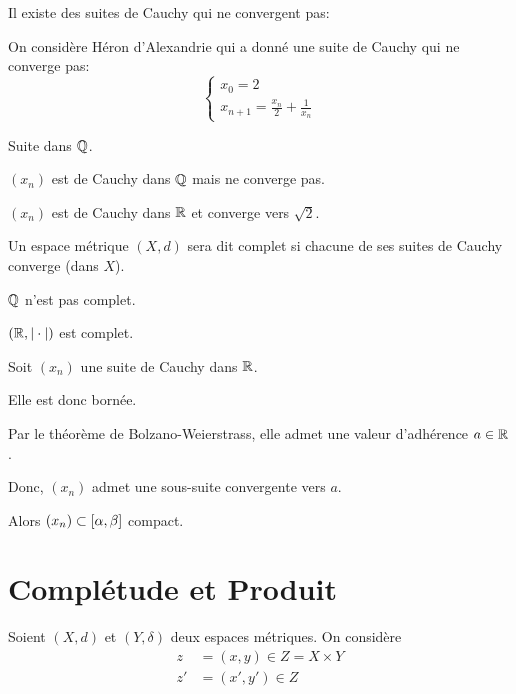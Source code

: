 \documentclass[french,a4paper,10pt]{article}
\begin{document}
    \begin{remark}
        Il existe des suites de Cauchy qui ne convergent pas:

        On considère Héron d'Alexandrie qui a donné une suite de Cauchy qui ne converge pas:
        \[\begin{cases}
            x_0=2\\
            x_{n+1}=\frac{x_n}2+\frac1{x_n}
        \end{cases}\]

        Suite dans $\mathbb{Q}$. 

        $(x_n)$ est de Cauchy dans $\mathbb{Q}$ mais ne converge pas.

        $(x_n)$ est de Cauchy dans $\mathbb{R}$ et converge vers $\sqrt 2$.
    \end{remark}

    \begin{definition}
        Un espace métrique $(X,d)$ sera dit complet si chacune de ses suites de Cauchy converge (dans $X$).
    \end{definition}

    \begin{example}
        $\mathbb{Q}$ n'est pas complet.
    \end{example}

    \begin{proposition}
        $(\mathbb{R},|\cdot|)$ est complet.
    \end{proposition}

    \begin{myproof}
        Soit $(x_n)$ une suite de Cauchy dans $\mathbb{R}$.

        Elle est donc bornée.

        Par le théorème de Bolzano-Weierstrass, elle admet une valeur d'adhérence $a\in\mathbb{R}$.

        Donc, $(x_n)$ admet une sous-suite convergente vers $a$.

        Alors $(x_n) \subset \mathopen{[}\alpha, \beta\mathclose{]}$ compact.
    \end{myproof}

    \section{Complétude et Produit}

    Soient $(X,d)$ et $(Y,\delta)$ deux espaces métriques.
    On considère
    \[\begin{aligned}
        z &= (x,y)\in Z = X\times Y\\
        z' &= (x',y')\in Z
    \end{aligned}\]
\end{document}
